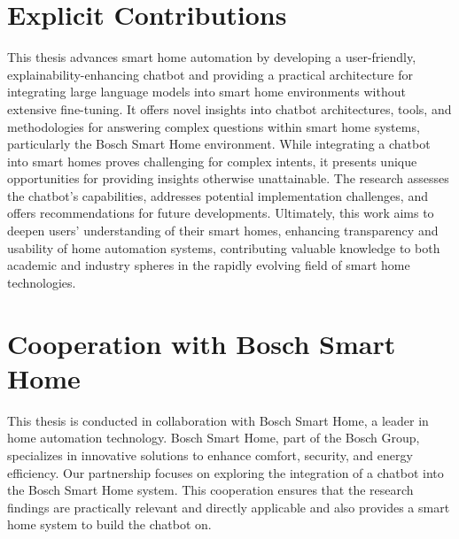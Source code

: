 \section{Explicit Contributions}
This thesis advances smart home automation by developing a user-friendly, explainability-enhancing chatbot and providing a practical architecture for integrating large language models into smart home environments without extensive fine-tuning. 
It offers novel insights into chatbot architectures, tools, and methodologies for answering complex questions within smart home systems, particularly the Bosch Smart Home environment. 
While integrating a chatbot into smart homes proves challenging for complex intents, it presents unique opportunities for providing insights otherwise unattainable. 
The research assesses the chatbot's capabilities, addresses potential implementation challenges, and offers recommendations for future developments. 
Ultimately, this work aims to deepen users' understanding of their smart homes, enhancing transparency and usability of home automation systems, contributing valuable knowledge to both academic and industry spheres in the rapidly evolving field of smart home technologies.

\section{Cooperation with Bosch Smart Home}
This thesis is conducted in collaboration with Bosch Smart Home, a leader in home automation technology. Bosch Smart Home, part of the Bosch Group, specializes in innovative solutions to enhance comfort, security, and energy efficiency.
Our partnership focuses on exploring the integration of a chatbot into the Bosch Smart Home system. This cooperation ensures that the research findings are practically relevant and directly applicable and also provides a smart home system to build the chatbot on.

